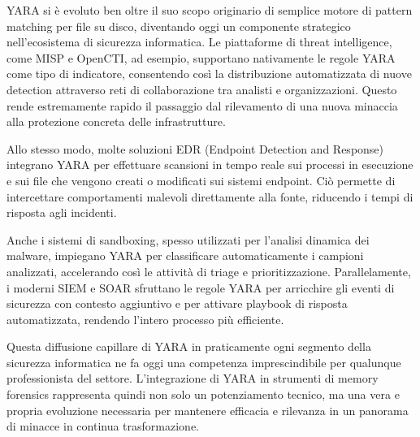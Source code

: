YARA si è evoluto ben oltre il suo scopo originario di semplice motore di pattern matching per file su disco, diventando oggi un componente strategico nell'ecosistema di sicurezza informatica. Le piattaforme di threat intelligence, come MISP e OpenCTI, ad esempio, supportano nativamente le regole YARA come tipo di indicatore, consentendo così la distribuzione automatizzata di nuove detection attraverso reti di collaborazione tra analisti e organizzazioni. Questo rende estremamente rapido il passaggio dal rilevamento di una nuova minaccia alla protezione concreta delle infrastrutture.

Allo stesso modo, molte soluzioni EDR (Endpoint Detection and Response) integrano YARA per effettuare scansioni in tempo reale sui processi in esecuzione e sui file che vengono creati o modificati sui sistemi endpoint. Ciò permette di intercettare comportamenti malevoli direttamente alla fonte, riducendo i tempi di risposta agli incidenti.

Anche i sistemi di sandboxing, spesso utilizzati per l’analisi dinamica dei malware, impiegano YARA per classificare automaticamente i campioni analizzati, accelerando così le attività di triage e prioritizzazione. Parallelamente, i moderni SIEM e SOAR sfruttano le regole YARA per arricchire gli eventi di sicurezza con contesto aggiuntivo e per attivare playbook di risposta automatizzata, rendendo l'intero processo più efficiente.

Questa diffusione capillare di YARA in praticamente ogni segmento della sicurezza informatica ne fa oggi una competenza imprescindibile per qualunque professionista del settore. L'integrazione di YARA in strumenti di memory forensics rappresenta quindi non solo un potenziamento tecnico, ma una vera e propria evoluzione necessaria per mantenere efficacia e rilevanza in un panorama di minacce in continua trasformazione.